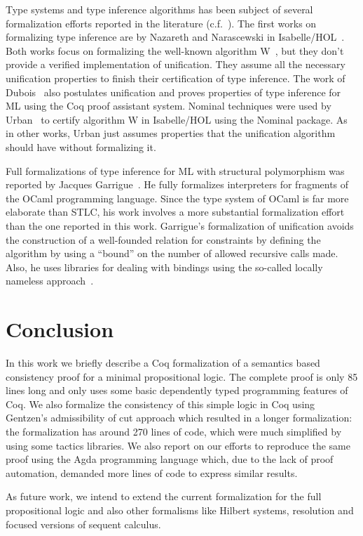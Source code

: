 Type systems and type inference algorithms has been subject of several formalization efforts
reported in the literature (c.f.~\cite{DuboisM99,NaraschewskiN-JAR,Nazareth-Nipkow,UrbanN2009,Garrigue10,Garrigue15}).
The first works on formalizing type inference are by Nazareth and
Narascewski in Isabelle/HOL~\cite{NaraschewskiN-JAR,Nazareth-Nipkow}.
Both works focus on formalizing the well-known algorithm
W~\cite{Milner1978}, but they don't provide a verified
implementation of unification. They assume all the necessary
unification properties to finish their certification of type
inference. The work of Dubois~\cite{DuboisM99} also postulates
unification and proves properties of type inference for ML using the
Coq proof assistant system.  Nominal techniques were used by
Urban~\cite{UrbanN2009} to certify algorithm W in Isabelle/HOL using
the Nominal package. As in other works, Urban just assumes properties
that the unification algorithm should have without formalizing it.


Full formalizations of type inference for ML with structural
polymorphism was reported by Jacques
Garrigue~\cite{Garrigue10,Garrigue15}. He fully formalizes
interpreters for fragments of the OCaml programming language. Since
the type system of OCaml is far more elaborate than STLC, his work
involves a more substantial formalization effort than the one reported
in this work. Garrigue's formalization of unification avoids the
construction of a well-founded relation for constraints by defining
the algorithm by using a ``bound'' on the number of allowed recursive
calls made.  Also, he uses libraries for dealing with bindings using
the so-called locally nameless approach~\cite{Chargueraud12}.


\section{Conclusion}\label{sec:conclusion}


In this work we briefly describe a Coq formalization of a semantics based consistency proof for
a minimal propositional logic. The complete proof is only 85 lines long and only uses some basic
dependently typed programming features of Coq. We also
formalize the consistency of this simple logic in Coq using Gentzen's admissibility of cut approach
which resulted in a longer formalization: the formalization has around 270 lines of code, which were much
simplified by using some tactics libraries. We also report on our efforts to reproduce the same proof
using the Agda programming language which, due to the lack of proof automation, demanded more lines of code
to express similar results.


As future work, we intend to extend the current formalization for the full propositional logic and also
other formalisms like Hilbert systems, resolution and focused versions of sequent calculus.
 \begin{coqdoccode}
\end{coqdoccode}

